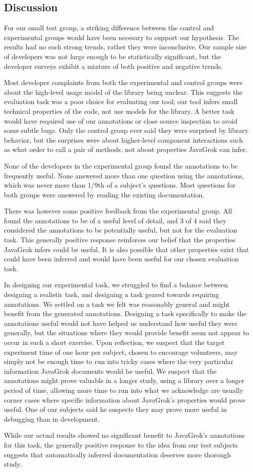 \subsection{Discussion}
For our small test group, a striking difference between the control and
experimental groups would have been necesary to support our hypothesis.  The
results had no such strong
trends, rather they were inconclusive.  Our sample size of developers was not
large enough to be statistically significant, but the developer surveys exhibit
a mixture of both positive and negative trends.

Most developer complaints from both the experimental and control groups were
about the high-level usage model of the library being unclear.  This suggests
the evaluation task was
a poor choice for evaluating our tool; our tool infers small technical
properties of the code, not use models for the library.  A better task would
have required use of our annotations or close source inspection to avoid some
subtle bugs.  Only the control group ever said they were surprised by library
behavior, but the surprises were about higher-level component interactions such
as what order to call a pair of methods, not about properties JavaGrok can
infer.

None of the developers in the experimental group found the annotations to be
frequently useful.  None answered more than one question using the
annotations, which was never more than 1/9th of a subject's questions.  Most
questions for both groups were answered by reading the existing documentation.

There was however some positive feedback from the experimental group.  All
found the annotations to be of a useful level of detail, and 3 of 4 said they
considered the annotations
to be potentially useful, but not for the evaluation task.  This generally
positive response reinforces our belief that the properties
JavaGrok infers could be useful.  It is also possible that other properties
exist that could have been inferred and would have been useful for our chosen
evaluation task.

In designing
our experimental task, we struggled to find a balance between designing a
realistic task, and designing a task geared towards requiring annotations.  We
settled on a task we felt was reasonably general and might benefit from the
generated annotations.  Designing a task specifically to make the annotations useful would
not have helped us understand how useful they were generally, but the situations
where they would provide benefit seem not appear to occur in such a short exercise.
Upon reflection, we suspect that the target experiment time of one hour per
subject, chosen to encourage volunteers, may simply not be enough time to run
into tricky cases where the very particular information JavaGrok documents would
be useful.  We suspect that the annotations might prove valuable in a longer
study, using a library over a longer period of time, allowing more time to run
into what we acknowledge are usually corner cases where specific information
about JavaGrok's properties would prove useful.  One of our subjects said he
suspects they may prove more useful in debugging than in development.

While our actual results showed no significant benefit to JavaGrok's annotations
for this task, the generally positive response to the idea from our test
subjects suggests that automatically inferred documentation deserves more
thorough study.

